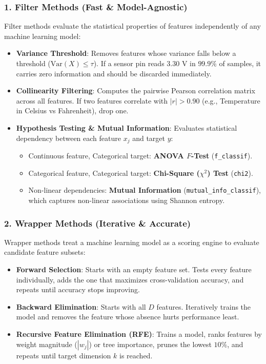 \subsubsection{1. Filter Methods (Fast \& Model-Agnostic)}
Filter methods evaluate the statistical properties of features independently of any machine learning model:
\begin{itemize}
    \item \textbf{Variance Threshold}: Removes features whose variance falls below a threshold ($\text{Var}(X) \le \tau$). If a sensor pin reads $3.30\text{ V}$ in $99.9\%$ of samples, it carries zero information and should be discarded immediately.
    \item \textbf{Collinearity Filtering}: Computes the pairwise Pearson correlation matrix across all features. If two features correlate with $|r| > 0.90$ (e.g., Temperature in Celsius vs Fahrenheit), drop one.
    \item \textbf{Hypothesis Testing \& Mutual Information}: Evaluates statistical dependency between each feature $x_j$ and target $y$:
    \begin{itemize}
        \item Continuous feature, Categorical target: \textbf{ANOVA $F$-Test} (\texttt{f\_classif}).
        \item Categorical feature, Categorical target: \textbf{Chi-Square ($\chi^2$) Test} (\texttt{chi2}).
        \item Non-linear dependencies: \textbf{Mutual Information} (\texttt{mutual\_info\_classif}), which captures non-linear associations using Shannon entropy.
    \end{itemize}
\end{itemize}

\subsubsection{2. Wrapper Methods (Iterative \& Accurate)}
Wrapper methods treat a machine learning model as a scoring engine to evaluate candidate feature subsets:
\begin{itemize}
    \item \textbf{Forward Selection}: Starts with an empty feature set. Tests every feature individually, adds the one that maximizes cross-validation accuracy, and repeats until accuracy stops improving.
    \item \textbf{Backward Elimination}: Starts with all $D$ features. Iteratively trains the model and removes the feature whose absence hurts performance least.
    \item \textbf{Recursive Feature Elimination (RFE)}: Trains a model, ranks features by weight magnitude ($|w_j|$) or tree importance, prunes the lowest $10\%$, and repeats until target dimension $k$ is reached.
\end{itemize}

